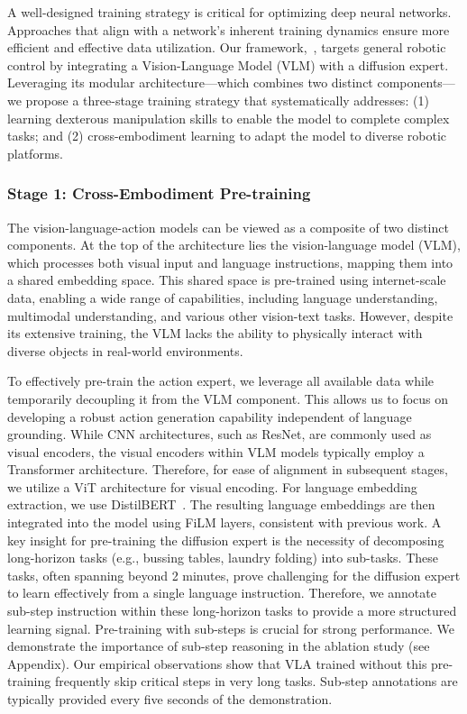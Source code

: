 A well-designed training strategy is critical for optimizing deep neural networks. Approaches that align with a network's inherent training dynamics ensure more efficient and effective data utilization. Our framework,~\methodname, targets general robotic control by integrating a Vision-Language Model (VLM) with a diffusion expert. Leveraging its modular architecture—which combines two distinct components—we propose a three-stage training strategy that systematically addresses: (1) learning dexterous manipulation skills to enable the model to complete complex tasks; and (2) cross-embodiment learning to adapt the model to diverse robotic platforms.


\subsubsection{Stage 1: Cross-Embodiment Pre-training}
\label{sec:stage1}
The vision-language-action models can be viewed as a composite of two distinct components.  At the top of the architecture lies the vision-language model (VLM), which processes both visual input and language instructions, mapping them into a shared embedding space. This shared space is pre-trained using internet-scale data, enabling a wide range of capabilities, including language understanding, multimodal understanding, and various other vision-text tasks. However, despite its extensive training, the VLM lacks the ability to physically interact with diverse objects in real-world environments.

To effectively pre-train the action expert, we leverage all available data while temporarily decoupling it from the VLM component. This allows us to focus on developing a robust action generation capability independent of language grounding. While CNN architectures, such as ResNet, are commonly used as visual encoders, the visual encoders within VLM models typically employ a Transformer architecture. Therefore, for ease of alignment in subsequent stages, we utilize a ViT architecture for visual encoding. For language embedding extraction, we use DistilBERT~\cite{sanh2019distilbert}. The resulting language embeddings are then integrated into the model using FiLM layers, consistent with previous work. A key insight for pre-training the diffusion expert is the necessity of decomposing long-horizon tasks (e.g., bussing tables, laundry folding) into sub-tasks. These tasks, often spanning beyond 2 minutes, prove challenging for the diffusion expert to learn effectively from a single language instruction. Therefore, we annotate sub-step instruction within these long-horizon tasks to provide a more structured learning signal. Pre-training with sub-steps is crucial for strong performance. We demonstrate the importance of sub-step reasoning in the ablation study (see Appendix).  Our empirical observations show that VLA trained without this pre-training frequently skip critical steps in very long tasks.  Sub-step annotations are typically provided every five seconds of the demonstration.


